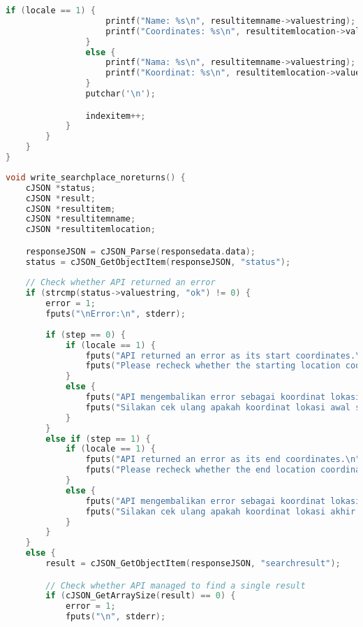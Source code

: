 \begin{lstlisting}[label={appdx:A-write-searchplace}, language=C, caption=\texttt{write\textunderscore searchplace()}]
                if (locale == 1) {
                    printf("Name: %s\n", resultitemname->valuestring);
                    printf("Coordinates: %s\n", resultitemlocation->valuestring);
                }
                else {
                    printf("Nama: %s\n", resultitemname->valuestring);
                    printf("Koordinat: %s\n", resultitemlocation->valuestring);
                }
                putchar('\n');

                indexitem++;
            }
        }
    }
}
\end{lstlisting}

\begin{lstlisting}[label={appdx:A-write-findroute}, language=C, caption=\texttt{write\textunderscore findroute()}]
void write_searchplace_noreturns() {
    cJSON *status;
    cJSON *result;
    cJSON *resultitem;
    cJSON *resultitemname;
    cJSON *resultitemlocation;

    responseJSON = cJSON_Parse(responsedata.data);
    status = cJSON_GetObjectItem(responseJSON, "status");
    
    // Check whether API returned an error
    if (strcmp(status->valuestring, "ok") != 0) {
        error = 1;
        fputs("\nError:\n", stderr);
        
        if (step == 0) {
            if (locale == 1) {
                fputs("API returned an error as its start coordinates.\n", stderr);
                fputs("Please recheck whether the starting location coordinates were inputted correctly.\n", stderr);
            }
            else {
                fputs("API mengembalikan error sebagai koordinat lokasi awal.\n", stderr);
                fputs("Silakan cek ulang apakah koordinat lokasi awal sudah dimasukkan dengan benar.\n", stderr);
            }
        }
        else if (step == 1) {
            if (locale == 1) {
                fputs("API returned an error as its end coordinates.\n", stderr);
                fputs("Please recheck whether the end location coordinates were inputted correctly.\n", stderr);
            }
            else {
                fputs("API mengembalikan error sebagai koordinat lokasi akhir.\n", stderr);
                fputs("Silakan cek ulang apakah koordinat lokasi akhir sudah dimasukkan dengan benar.\n", stderr);
            }
        }
    }
    else {
        result = cJSON_GetObjectItem(responseJSON, "searchresult");

        // Check whether API managed to find a single result
        if (cJSON_GetArraySize(result) == 0) {
            error = 1;
            fputs("\n", stderr);
            

\end{lstlisting}
